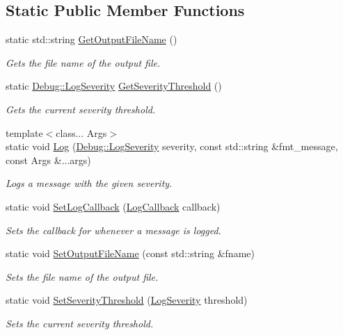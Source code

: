 \subsection*{Static Public Member Functions}
\begin{DoxyCompactItemize}
\item 
static std\+::string \hyperlink{classHatchit_1_1Core_1_1Debug_a66231a5f3c90eeec844eb50cc5f223fe}{Get\+Output\+File\+Name} ()
\begin{DoxyCompactList}\small\item\em Gets the file name of the output file. \end{DoxyCompactList}\item 
static \hyperlink{classHatchit_1_1Core_1_1Debug_a2a42bf8bcfbf6a7f8ec8f22c65470a37}{Debug\+::\+Log\+Severity} \hyperlink{classHatchit_1_1Core_1_1Debug_a359ddb78747d6001f294a3884427555d}{Get\+Severity\+Threshold} ()
\begin{DoxyCompactList}\small\item\em Gets the current severity threshold. \end{DoxyCompactList}\item 
{\footnotesize template$<$class... Args$>$ }\\static void \hyperlink{classHatchit_1_1Core_1_1Debug_a7a97b3ab2f6608e2c2985905cb20fe3b}{Log} (\hyperlink{classHatchit_1_1Core_1_1Debug_a2a42bf8bcfbf6a7f8ec8f22c65470a37}{Debug\+::\+Log\+Severity} severity, const std\+::string \&fmt\+\_\+message, const Args \&...args)
\begin{DoxyCompactList}\small\item\em Logs a message with the given severity. \end{DoxyCompactList}\item 
static void \hyperlink{classHatchit_1_1Core_1_1Debug_a1f15f3fd3c717638772f7f4b88cdd233}{Set\+Log\+Callback} (\hyperlink{classHatchit_1_1Core_1_1Debug_a0e7951bf02ef93ff3cd4eb9b7d3d4edb}{Log\+Callback} callback)
\begin{DoxyCompactList}\small\item\em Sets the callback for whenever a message is logged. \end{DoxyCompactList}\item 
static void \hyperlink{classHatchit_1_1Core_1_1Debug_a655e35db650cf2fb92617d5962e03cc9}{Set\+Output\+File\+Name} (const std\+::string \&fname)
\begin{DoxyCompactList}\small\item\em Sets the file name of the output file. \end{DoxyCompactList}\item 
static void \hyperlink{classHatchit_1_1Core_1_1Debug_a85fccb1b83d35493e1cc4aa291bff95c}{Set\+Severity\+Threshold} (\hyperlink{classHatchit_1_1Core_1_1Debug_a2a42bf8bcfbf6a7f8ec8f22c65470a37}{Log\+Severity} threshold)
\begin{DoxyCompactList}\small\item\em Sets the current severity threshold. \end{DoxyCompactList}\end{DoxyCompactItemize}


